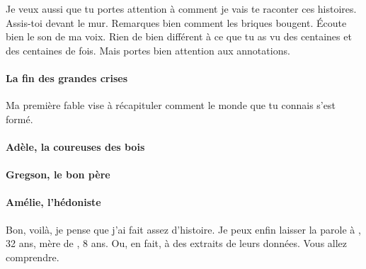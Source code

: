 Je veux aussi que tu portes attention à comment je vais te raconter ces histoires.
Assis-toi devant le mur. Remarques bien comment les briques bougent.
Écoute bien le son de ma voix.
Rien de bien différent à ce que tu as vu des centaines et des centaines de fois.
Mais portes bien attention aux annotations.

\paragraph{La fin des grandes crises}

Ma première fable vise à récapituler comment le monde que tu connais s'est formé.


\paragraph{Adèle, la coureuses des bois}

\paragraph{Gregson, le bon père} 

\paragraph{Amélie, l'hédoniste}

Bon, voilà, je pense que j'ai fait assez d'histoire. Je peux enfin laisser la
parole à \nomMere, 32 ans, mère de \nomEnfant, 8 ans. Ou, en fait, à des
extraits de leurs données. Vous allez comprendre.


